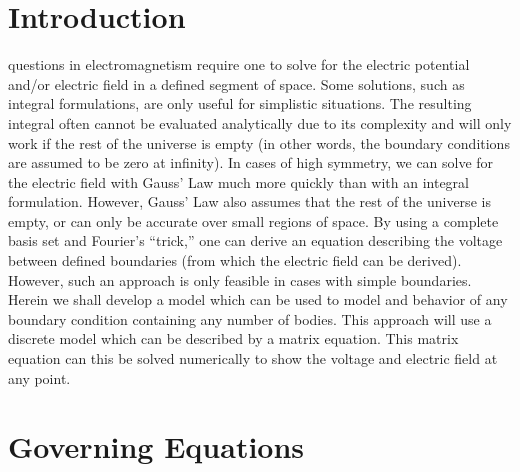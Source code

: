 \documentclass[journal]{IEEEtran}
\begin{document}
%


%


\section{Introduction}

 questions in electromagnetism require one to solve for the electric potential and/or electric field in a defined segment of space.  Some solutions, such as integral formulations, are only useful for simplistic situations.  The resulting integral often cannot be evaluated analytically due to its complexity and will only work if the rest of the universe is empty (in other words, the boundary conditions are assumed to be zero at infinity).  In cases of high symmetry, we can solve for the electric field with Gauss' Law much more quickly than with an integral formulation.  However, Gauss' Law also assumes that the rest of the universe is empty, or can only be accurate over small regions of space.  By using a complete basis set and Fourier's ``trick,'' one can derive an equation describing the voltage between defined boundaries (from which the electric field can be derived).  However, such an approach is only feasible in cases with simple boundaries.  Herein we shall develop a model which can be used to model and behavior of any boundary condition containing any number of bodies.  This approach will use a discrete model which can be described by a matrix equation.  This matrix equation can this be solved numerically to show the voltage and electric field at any point.

\section{Governing Equations}

\end{document}
